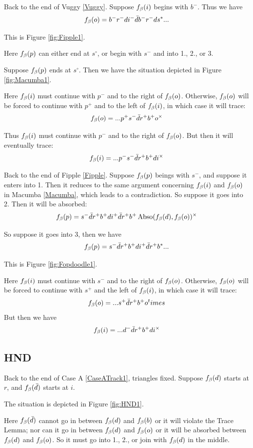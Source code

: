 \label{Fipple}
Back to the end of Vuggy \ref{Vuggy}. Suppose $f_\beta(i)$ begins with $b^-$. Thus we have
\[
f_\beta(o) = b^- r^- d i^- \bar{d} b^- r^- d s^*...
\]

This is Figure \ref{fig:Fipple1}.

Here $f_\beta(p)$ can either end at $s^\circ$, or begin with $s^-$ and into 1., 2., or 3.

\label{Macumba}
Suppose $f_\beta(p)$ ends at $s^\circ$. Then we have the situation depicted in Figure \ref{fig:Macumba1}.

Here $f_\beta(i)$ must continue with $p^-$ and to the right of $f_\beta(o)$. Otherwise, $f_\beta(o)$ will be forced to continue with $p^+$ and to the left of $f_\beta(i)$, in which case it will trace:
\[
f_\beta(o) = ...p^+ s^- \bar{d} r^+ b^+ o^\times
\]

Thus $f_\beta(i)$ must continue with $p^-$ and to the right of $f_\beta(o)$. But then it will eventually trace:
\[
f_\beta(i) = ... p^- s^- \bar{d} r^+ b^+ d i^\times
\]

\label{Fopdoodle}
Back to the end of Fipple \ref{Fipple}. Suppose $f_\beta(p)$ beings with $s^-$, and suppose it enters into 1. Then it reduces to the same argument concerning $f_\beta(i)$ and $f_\beta(o)$ in Macumba \ref{Macumba}, which leads to a contradiction. So suppose it goes into 2. Then it will be absorbed:
\[
f_\beta(p) = s^- \bar{d} r^+ b^+ d i^+ \bar{d} r^+ b^+ \operatorname{Abso}(f_\beta(d), f_\beta(o))^\times
\]

So suppose it goes into 3, then we have
\[
f_\beta(p) = s^- \bar{d} r^+ b^+ d i^+ \bar{d} r^+ b^*...
\]

This is Figure \ref{fig:Fopdoodle1}.

Here $f_\beta(i)$ must continue with $s^-$ and to the right of $f_\beta(o)$. Otherwise, $f_\beta(o)$ will be forced to continue with $s^+$ and the left of $f_\beta(i)$, in which case it will trace:
\[
f_\beta(o) = ... s^+ \bar{d} r^+ b^+ o^times
\]
But then we have
\[
f_\beta(i) = ...d^- \bar{d} r^+ b^+ d i^\times 
\]

\subsection{HND}\label{HND}
Back to the end of Case A \ref{CaseATrack1}, triangles fixed. Suppose $f_\beta(d)$ starts at $r$, and $f_\beta(\bar{d})$ starts at $i$.

The situation is depicted in Figure \ref{fig:HND1}.

Here $f_\beta(\bar{d})$ cannot go in between $f_\beta(d)$ and $f_\beta(b)$ or it will violate the Trace Lemma; nor can it go in between $f_\beta(d)$ and $f_\beta(o)$ or it will be absorbed between $f_\beta(d)$ and $f_\beta(o)$. So it must go into 1., 2., or join with $f_\beta(d)$ in the middle.

